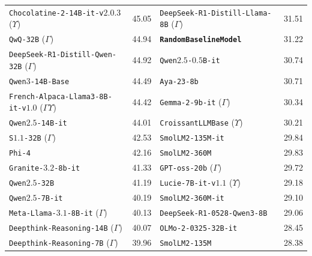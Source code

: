 \begin{tabular}{lrlr}
\texttt{Chocolatine-2-14B-it-v$2.0.3$} ($\Upsilon$) & 45.05 & \texttt{DeepSeek-R1-Distill-Llama-8B} ($\Gamma$) & 31.51 \\
\texttt{QwQ-32B} ($\Gamma$) & 44.94 & \texttt{\textbf{RandomBaselineModel}} & 31.22 \\
\texttt{DeepSeek-R1-Distill-Qwen-32B} ($\Gamma$) & 44.92 & \texttt{Qwen$2.5$-$0.5$B-it} & 30.74 \\
\texttt{Qwen$3$-14B-Base} & 44.49 & \texttt{Aya-23-8b} & 30.71 \\
\texttt{French-Alpaca-Llama3-8B-it-v$1.0$} ($\Gamma$$\Upsilon$) & 44.42 & \texttt{Gemma-2-9b-it} ($\Gamma$) & 30.34 \\
\texttt{Qwen$2.5$-14B-it} & 44.01 & \texttt{CroissantLLMBase} ($\Upsilon$) & 30.21 \\
\texttt{S$1.1$-32B} ($\Gamma$) & 42.53 & \texttt{SmolLM2-135M-it} & 29.84 \\
\texttt{Phi-4} & 42.16 & \texttt{SmolLM2-360M} & 29.83 \\
\texttt{Granite-$3.2$-8b-it} & 41.33 & \texttt{GPT-oss-20b} ($\Gamma$) & 29.72 \\
\texttt{Qwen$2.5$-32B} & 41.19 & \texttt{Lucie-7B-it-v$1.1$} ($\Upsilon$) & 29.18 \\
\texttt{Qwen$2.5$-7B-it} & 40.19 & \texttt{SmolLM2-360M-it} & 29.10 \\
\texttt{Meta-Llama-$3.1$-8B-it} ($\Gamma$) & 40.13 & \texttt{DeepSeek-R1-0528-Qwen3-8B} & 29.06 \\
\texttt{Deepthink-Reasoning-14B} ($\Gamma$) & 40.07 & \texttt{OLMo-2-0325-32B-it} & 28.45 \\
\texttt{Deepthink-Reasoning-7B} ($\Gamma$) & 39.96 & \texttt{SmolLM2-135M} & 28.38 \\
\bottomrule
\end{tabular}
